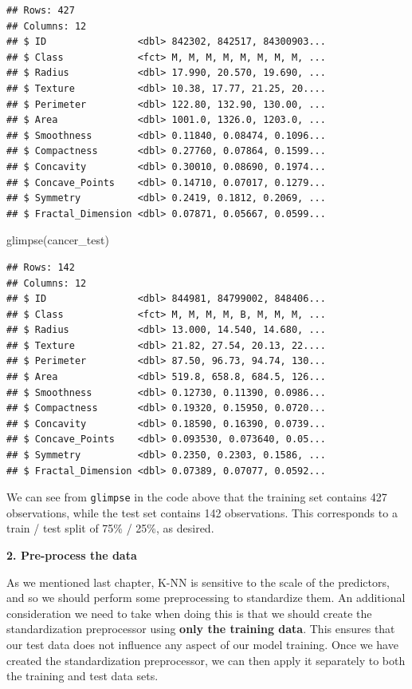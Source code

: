 \documentclass[
]{krantz}
\makeatletter
\newenvironment{Shaded}{\begin{snugshade}}{\end{snugshade}}
\newcommand{\FunctionTok}[1]{\textcolor[rgb]{0,0,0}{#1}}
\newcommand{\NormalTok}[1]{#1}
\newenvironment{kframe}{%
\medskip{}
\setlength{\fboxsep}{.8em}
 \def\at@end@of@kframe{}%
 \ifinner\ifhmode%
  \def\at@end@of@kframe{\end{minipage}}%
  \begin{minipage}{\columnwidth}%
 \fi\fi%
 \def\FrameCommand##1{\hskip\@totalleftmargin \hskip-\fboxsep
 \colorbox{shadecolor}{##1}\hskip-\fboxsep
     \hskip-\linewidth \hskip-\@totalleftmargin \hskip\columnwidth}%
 \MakeFramed {\advance\hsize-\width
   \@totalleftmargin\z@ \linewidth\hsize
   \@setminipage}}%
 {\par\unskip\endMakeFramed%
 \at@end@of@kframe}
\renewenvironment{Shaded}{\begin{kframe}}{\end{kframe}}
\makeatother
\begin{document}
\begin{verbatim}
## Rows: 427
## Columns: 12
## $ ID                <dbl> 842302, 842517, 84300903...
## $ Class             <fct> M, M, M, M, M, M, M, M, ...
## $ Radius            <dbl> 17.990, 20.570, 19.690, ...
## $ Texture           <dbl> 10.38, 17.77, 21.25, 20....
## $ Perimeter         <dbl> 122.80, 132.90, 130.00, ...
## $ Area              <dbl> 1001.0, 1326.0, 1203.0, ...
## $ Smoothness        <dbl> 0.11840, 0.08474, 0.1096...
## $ Compactness       <dbl> 0.27760, 0.07864, 0.1599...
## $ Concavity         <dbl> 0.30010, 0.08690, 0.1974...
## $ Concave_Points    <dbl> 0.14710, 0.07017, 0.1279...
## $ Symmetry          <dbl> 0.2419, 0.1812, 0.2069, ...
## $ Fractal_Dimension <dbl> 0.07871, 0.05667, 0.0599...
\end{verbatim}

\begin{Shaded}
\begin{Highlighting}[]
\FunctionTok{glimpse}\NormalTok{(cancer\_test)}
\end{Highlighting}
\end{Shaded}

\begin{verbatim}
## Rows: 142
## Columns: 12
## $ ID                <dbl> 844981, 84799002, 848406...
## $ Class             <fct> M, M, M, M, B, M, M, M, ...
## $ Radius            <dbl> 13.000, 14.540, 14.680, ...
## $ Texture           <dbl> 21.82, 27.54, 20.13, 22....
## $ Perimeter         <dbl> 87.50, 96.73, 94.74, 130...
## $ Area              <dbl> 519.8, 658.8, 684.5, 126...
## $ Smoothness        <dbl> 0.12730, 0.11390, 0.0986...
## $ Compactness       <dbl> 0.19320, 0.15950, 0.0720...
## $ Concavity         <dbl> 0.18590, 0.16390, 0.0739...
## $ Concave_Points    <dbl> 0.093530, 0.073640, 0.05...
## $ Symmetry          <dbl> 0.2350, 0.2303, 0.1586, ...
## $ Fractal_Dimension <dbl> 0.07389, 0.07077, 0.0592...
\end{verbatim}

We can see from \texttt{glimpse} in the code above that the training set contains 427
observations, while the test set contains 142 observations. This corresponds to
a train / test split of 75\% / 25\%, as desired.

\textbf{2. Pre-process the data}

As we mentioned last chapter, K-NN is sensitive to the scale of the predictors,
and so we should perform some preprocessing to standardize them. An
additional consideration we need to take when doing this is that we should
create the standardization preprocessor using \textbf{only the training data}. This ensures that
our test data does not influence any aspect of our model training. Once we have
created the standardization preprocessor, we can then apply it separately to both the
training and test data sets.
\end{document}
